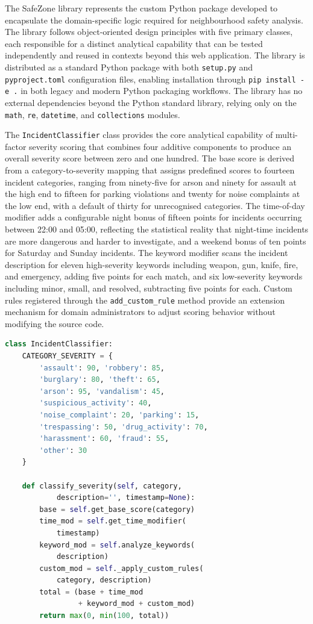 \documentclass[conference]{IEEEtran}
\begin{document}
The SafeZone library represents the custom Python package developed to encapsulate the domain-specific logic required for neighbourhood safety analysis. The library follows object-oriented design principles with five primary classes, each responsible for a distinct analytical capability that can be tested independently and reused in contexts beyond this web application. The library is distributed as a standard Python package with both \texttt{setup.py} and \texttt{pyproject.toml} configuration files, enabling installation through \texttt{pip install -e .} in both legacy and modern Python packaging workflows. The library has no external dependencies beyond the Python standard library, relying only on the \texttt{math}, \texttt{re}, \texttt{datetime}, and \texttt{collections} modules.

The \texttt{IncidentClassifier} class provides the core analytical capability of multi-factor severity scoring that combines four additive components to produce an overall severity score between zero and one hundred. The base score is derived from a category-to-severity mapping that assigns predefined scores to fourteen incident categories, ranging from ninety-five for arson and ninety for assault at the high end to fifteen for parking violations and twenty for noise complaints at the low end, with a default of thirty for unrecognised categories. The time-of-day modifier adds a configurable night bonus of fifteen points for incidents occurring between 22:00 and 05:00, reflecting the statistical reality that night-time incidents are more dangerous and harder to investigate, and a weekend bonus of ten points for Saturday and Sunday incidents. The keyword modifier scans the incident description for eleven high-severity keywords including weapon, gun, knife, fire, and emergency, adding five points for each match, and six low-severity keywords including minor, small, and resolved, subtracting five points for each. Custom rules registered through the \texttt{add\_custom\_rule} method provide an extension mechanism for domain administrators to adjust scoring behavior without modifying the source code.

\begin{lstlisting}[language=Python, caption=IncidentClassifier severity scoring algorithm]
class IncidentClassifier:
    CATEGORY_SEVERITY = {
        'assault': 90, 'robbery': 85,
        'burglary': 80, 'theft': 65,
        'arson': 95, 'vandalism': 45,
        'suspicious_activity': 40,
        'noise_complaint': 20, 'parking': 15,
        'trespassing': 50, 'drug_activity': 70,
        'harassment': 60, 'fraud': 55,
        'other': 30
    }

    def classify_severity(self, category,
            description='', timestamp=None):
        base = self.get_base_score(category)
        time_mod = self.get_time_modifier(
            timestamp)
        keyword_mod = self.analyze_keywords(
            description)
        custom_mod = self._apply_custom_rules(
            category, description)
        total = (base + time_mod
                 + keyword_mod + custom_mod)
        return max(0, min(100, total))
\end{lstlisting}
\end{document}
